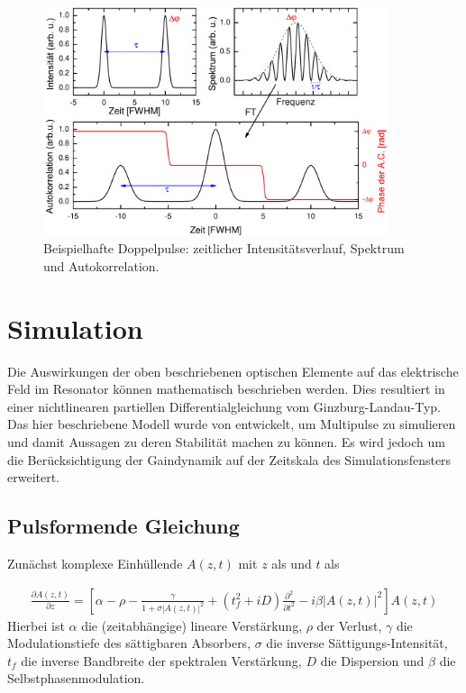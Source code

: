 \documentclass[bachelor,       %
               twoside,        %
               BCOR10mm,       %
               liststotoc,nomtotoc,bibtotoc, %
               english,ngerman, %
               final,          %
               ]{GAUBM}
\begin{document}
\begin{figure}[!htb]
	\centering
	\includegraphics[width=0.9\textwidth]{figures/pulsBsp}
	\caption{Beispielhafte Doppelpulse: zeitlicher Intensitätsverlauf, Spektrum und Autokorrelation.}
	\label{fig:PulsBsp}
\end{figure}

\section{Simulation}
\label{sec:SimTheo}
Die Auswirkungen der oben beschriebenen optischen Elemente auf das elektrische Feld im Resonator können mathematisch beschrieben werden.
Dies resultiert in einer nichtlinearen partiellen Differentialgleichung vom Ginzburg-Landau-Typ.
Das hier beschriebene Modell wurde von \cite{kalashnikov_multipulse_2003} entwickelt, um Multipulse zu simulieren und damit Aussagen zu deren Stabilität machen zu können.
Es wird jedoch um die Berücksichtigung der Gaindynamik auf der Zeitskala des Simulationsfensters erweitert.


\subsection{Pulsformende Gleichung}
Zunächst komplexe Einhüllende $A(z,t)$ mit $z$ als und $t$ als 

\begin{align}
	\frac{\partial A(z,t)}{\partial z}=\left[\alpha-\rho-\frac{\gamma}{1+\sigma|A(z,t)|^2}+(t_f^2+iD)\frac{\partial^2}{\partial t^2}-i\beta |A(z,t)|^2\right]A(z,t)
	\label{eq:ginzburgLandau}
\end{align}
Hierbei ist $\alpha$ die (zeitabhängige) lineare Verstärkung, $\rho$ der Verlust, $\gamma$ die Modulationstiefe des sättigbaren Absorbers, $\sigma$ die inverse Sättigungs-Intensität, $t_f$ die inverse Bandbreite der spektralen Verstärkung, $D$ die Dispersion und $\beta$ die Selbstphasenmodulation.
\end{document}
